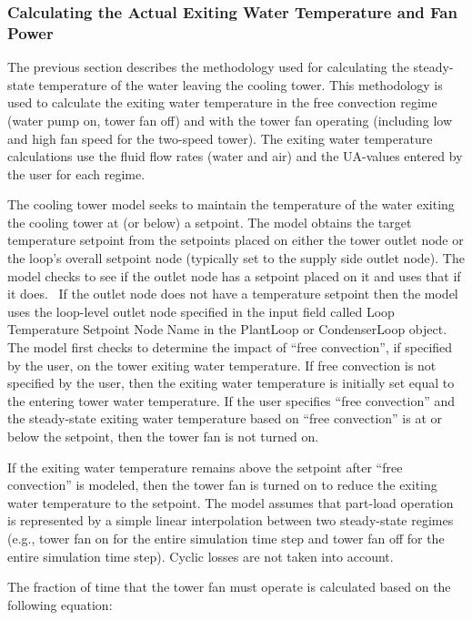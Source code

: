\subsubsection{Calculating the Actual Exiting Water Temperature and Fan Power}\label{calculating-the-actual-exiting-water-temperature-and-fan-power}

The previous section describes the methodology used for calculating the steady-state temperature of the water leaving the cooling tower. This methodology is used to calculate the exiting water temperature in the free convection regime (water pump on, tower fan off) and with the tower fan operating (including low and high fan speed for the two-speed tower). The exiting water temperature calculations use the fluid flow rates (water and air) and the UA-values entered by the user for each regime.

The cooling tower model seeks to maintain the temperature of the water exiting the cooling tower at (or below) a setpoint. The model obtains the target temperature setpoint from the setpoints placed on either the tower outlet node or the loop's overall setpoint node (typically set to the supply side outlet node). The model checks to see if the outlet node has a setpoint placed on it and uses that if it does.~ If the outlet node does not have a temperature setpoint then the model uses the loop-level outlet node specified in the input field called Loop Temperature Setpoint Node Name in the PlantLoop or CondenserLoop object. The model first checks to determine the impact of ``free convection'', if specified by the user, on the tower exiting water temperature. If free convection is not specified by the user, then the exiting water temperature is initially set equal to the entering tower water temperature. If the user specifies ``free convection'' and the steady-state exiting water temperature based on ``free convection'' is at or below the setpoint, then the tower fan is not turned on.

If the exiting water temperature remains above the setpoint after ``free convection'' is modeled, then the tower fan is turned on to reduce the exiting water temperature to the setpoint. The model assumes that part-load operation is represented by a simple linear interpolation between two steady-state regimes (e.g., tower fan on for the entire simulation time step and tower fan off for the entire simulation time step). Cyclic losses are not taken into account.

The fraction of time that the tower fan must operate is calculated based on the following equation:

